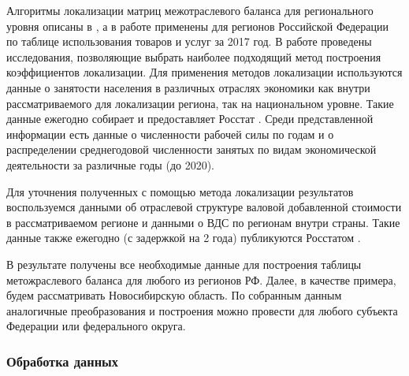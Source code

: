 \documentclass[12pt, a4paper]{article}
\begin{document}
Алгоритмы локализации матриц межотраслевого баланса для регионального уровня описаны в \cite{MOBFlegg}, а в работе \cite{MOBLoc} применены для регионов Российской Федерации по таблице использования товаров и услуг за 2017 год. В работе \cite{MOBAccur} 
 проведены исследования, позволяющие выбрать наиболее подходящий метод построения коэффициентов локализации. Для применения методов локализации используются данные о занятости населения в различных отраслях экономики как внутри рассматриваемого для локализации региона, так на национальном уровне. Такие данные ежегодно собирает и предоставляет Росстат \cite{RegionStat}. 
 Среди представленной информации есть данные о численности рабочей силы по годам и о распределении среднегодовой численности занятых по видам экономической деятельности за различные годы (до 2020).

Для уточнения полученных с помощью метода локализации результатов воспользуемся данными об отраслевой структуре валовой добавленной стоимости в рассматриваемом регионе и данными о ВДС по регионам внутри страны. Такие данные также ежегодно (с задержкой на 2 года) публикуются Росстатом \cite{RegionStat}.

В результате получены все необходимые данные для построения таблицы метожраслевого баланса для любого из регионов РФ. Далее, в качестве примера, будем рассматривать Новосибирскую область. По собранным данным аналогичные преобразования и построения можно провести для любого субъекта Федерации или федерального округа.

\subsubsection{Обработка данных}
\end{document}
